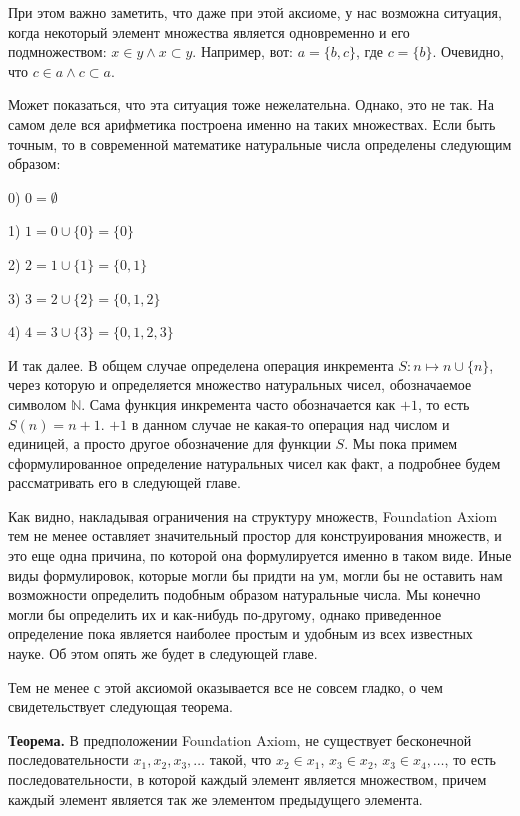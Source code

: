 При этом важно заметить, что даже при этой аксиоме, у нас возможна ситуация, когда некоторый элемент множества является одновременно и его подмножеством: $x\in y \wedge x\subset y$. Например, вот: $a = \{b, c\}$, где $c=\{ b\}$. Очевидно, что $c\in a \wedge c\subset a$.

Может показаться, что эта ситуация тоже нежелательна. Однако, это не так. На самом деле вся арифметика построена именно на таких множествах. Если быть точным, то в современной математике натуральные числа определены следующим образом:

0) $0 = \emptyset$

1) $1 = 0 \cup \{0\} = \{0\}$

2) $2 = 1 \cup \{1\} = \{0, 1\}$

3) $3 = 2\cup \{2\} = \{0, 1, 2\}$

4) $4 = 3 \cup \{3\} = \{0, 1, 2, 3\}$

И так далее. В общем случае определена операция инкремента $S: n\mapsto n\cup \{n\}$, через которую и определяется множество натуральных чисел, обозначаемое символом $\mathbb{N}$. Сама функция инкремента часто обозначается как $+1$, то есть $S(n) = n+1$. $+1$ в данном случае не какая-то операция над числом и единицей, а просто другое обозначение для функции $S$. Мы пока примем сформулированное определение натуральных чисел как факт, а подробнее будем рассматривать его в следующей главе.

Как видно, накладывая ограничения на структуру множеств, Foundation Axiom тем не менее оставляет значительный простор для конструирования множеств, и это еще одна причина, по которой она формулируется именно в таком виде.  Иные виды формулировок, которые могли бы придти на ум, могли бы не оставить нам возможности определить подобным образом натуральные числа. Мы конечно могли бы определить их и как-нибудь по-другому, однако приведенное определение пока является наиболее простым и удобным из всех известных науке. Об этом опять же будет в следующей главе.

Тем не менее с этой аксиомой оказывается все не совсем гладко, о чем свидетельствует следующая теорема.

{\bfseries Теорема.} В предположении Foundation Axiom, не существует бесконечной последовательности $x_1, x_2, x_3, \ldots$ такой, что $x_2 \in x_1$, $x_3 \in x_2$, $x_3 \in x_4, \ldots$, то есть последовательности, в которой каждый элемент является множеством, причем каждый элемент является так же элементом предыдущего элемента.


